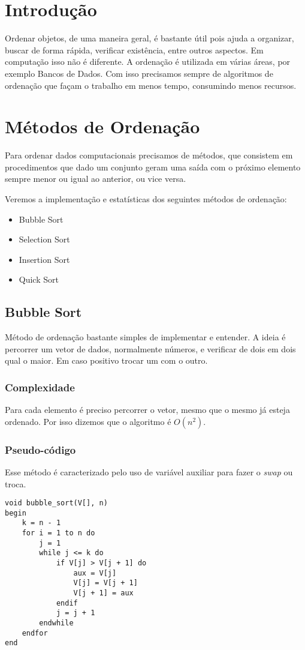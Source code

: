 \section{Introdução}

Ordenar objetos, de uma maneira geral, é bastante útil pois ajuda a
organizar, buscar de forma rápida, verificar existência, entre outros
aspectos. Em computação isso não é diferente. A ordenação é utilizada em
várias áreas, por exemplo Bancos de Dados. Com isso precisamos sempre de
algoritmos de ordenação que façam o trabalho em menos tempo, consumindo
menos recursos.

\section{Métodos de Ordenação}

Para ordenar dados computacionais precisamos de métodos, que consistem
em procedimentos que dado um conjunto geram uma saída com o próximo
elemento sempre menor ou igual ao anterior, ou vice versa.

Veremos a implementação e estatísticas dos seguintes métodos de
ordenação:

\begin{itemize}
\item
  Bubble Sort
\item
  Selection Sort
\item
  Insertion Sort
\item
  Quick Sort
\end{itemize}
\subsection{Bubble Sort}

Método de ordenação bastante simples de implementar e entender. A ideia
é percorrer um vetor de dados, normalmente números, e verificar de dois
em dois qual o maior. Em caso positivo trocar um com o outro.

\subsubsection{Complexidade}

Para cada elemento é preciso percorrer o vetor, mesmo que o mesmo já
esteja ordenado. Por isso dizemos que o algoritmo é $O(n^2)$.

\subsubsection{Pseudo-código}

Esse método é caracterizado pelo uso de variável auxiliar para fazer o
\emph{swap} ou troca.

\begin{verbatim}
void bubble_sort(V[], n)
begin
    k = n - 1
    for i = 1 to n do
        j = 1
        while j <= k do
            if V[j] > V[j + 1] do
                aux = V[j]
                V[j] = V[j + 1]
                V[j + 1] = aux
            endif
            j = j + 1
        endwhile
    endfor
end
\end{verbatim}

